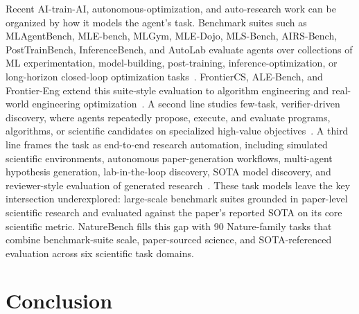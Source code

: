 \documentclass{llmxive}
\begin{document}
Recent AI-train-AI, autonomous-optimization, and auto-research work can be organized by how it models the agent's task. Benchmark suites such as MLAgentBench, MLE-bench, MLGym, MLE-Dojo, MLS-Bench, AIRS-Bench, PostTrainBench, InferenceBench, and AutoLab evaluate agents over collections of ML experimentation, model-building, post-training, inference-optimization, or long-horizon closed-loop optimization tasks~\citep{huang2023mlagentbench,shern2024mlebench,nathani2025mlgym,qiang2026mle,lyu2026mlsbench,lupidi2026airsbench,rank2026posttrainbench,yeon2026inferencebench,xu2026autolab}. FrontierCS, ALE-Bench, and Frontier-Eng extend this suite-style evaluation to algorithm engineering and real-world engineering optimization~\citep{mang2025frontiercs,imajuku2025alebench,chi2026frontiereng}. A second line studies few-task, verifier-driven discovery, where agents repeatedly propose, execute, and evaluate programs, algorithms, or scientific candidates on specialized high-value objectives~\citep{fawzi2022alphatensor,romeraparedes2023funsearch,novikov2025alphaevolve,wang2025thetaevolve,yuksekgonul2026tttdiscover,ye2026simpletes,cemri2026adaevolve,liu2026evox,jiang2026deltaevolve,lin2026aevolve,liu2025deepevolve}. A third line frames the task as end-to-end research automation, including simulated scientific environments, autonomous paper-generation workflows, multi-agent hypothesis generation, lab-in-the-loop discovery, SOTA model discovery, and reviewer-style evaluation of generated research~\citep{jansen2024discoveryworld,lu2024aiscientist,gottweis2026coscientist,ghareeb2026robin,li2026autosota,weng2025deepscientist,zhang2026researcharena,lyu2026evoscientist,zhu2026evomaster}. These task models leave the key intersection underexplored: large-scale benchmark suites grounded in paper-level scientific research and evaluated against the paper's reported SOTA on its core scientific metric. NatureBench fills this gap with 90 Nature-family tasks that combine benchmark-suite scale, paper-sourced science, and SOTA-referenced evaluation across six scientific task domains.




 

 



\section{Conclusion}
\label{sec:conclusion}
 
\end{document}
